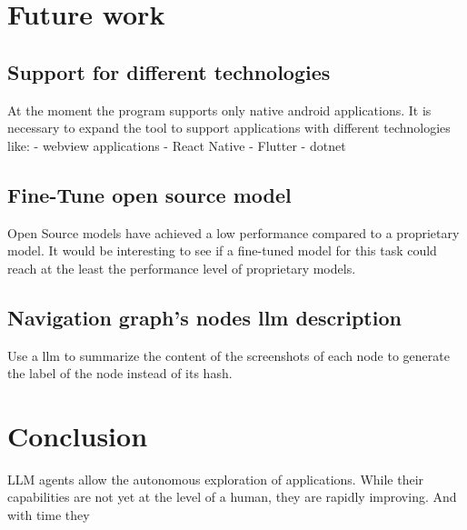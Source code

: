\section{Future work}\label{future-work}

\subsection{Support for different
technologies}\label{support-for-different-technologies}

At the moment the program supports only native android applications. It
is necessary to expand the tool to support applications with different
technologies like: - webview applications - React Native - Flutter -
dotnet

\subsection{Fine-Tune open source
model}\label{fine-tune-open-source-model}

Open Source models have achieved a low performance compared to a
proprietary model. It would be interesting to see if a fine-tuned model
for this task could reach at the least the performance level of
proprietary models.

\subsection{Navigation graph's nodes llm
description}\label{navigation-graphs-nodes-llm-description}

Use a llm to summarize the content of the screenshots of each node to
generate the label of the node instead of its hash.

\subsection{}\label{section}

\section{Conclusion}\label{conclusion}

LLM agents allow the autonomous exploration of applications. While their
capabilities are not yet at the level of a human, they are rapidly
improving. And with time they

